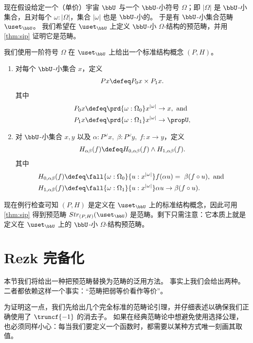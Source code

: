 现在假设给定一个（单价）宇宙 $\bbU$ 与一个 $\bbU$-小符号 $\Omega$；即 $|\Omega|$ 是 $\bbU$-小集合，且对每个 $\omega:|\Omega|$，集合 $|\omega|$ 也是 $\bbU$-小的。
于是有 $\bbU$-小集合范畴 $\uset_\bbU$。
我们希望在 $\uset_\bbU$ 上定义 $\bbU$-小 $\Omega$-结构的预范畴，并用 \cref{thm:sip} 证明它是范畴。

我们使用一阶符号 $\Omega$ 在 $\uset_\bbU$ 上给出一个标准结构概念 $(P,H)$。

\begin{defn}\label{defn:fo-notion-of-structure}
\mbox{}
\begin{enumerate}
\item 对每个 $\bbU$-小集合 $x$，定义
  \[ Px \defeq P_0x\times P_1x.\]
  其中
  \begin{align*}
    P_0x &\defeq \prd{\omega:\Omega_0} x^{|\omega|}\to x, \mbox{ and } \\
    P_1x &\defeq \prd{\omega:\Omega_1} x^{|\omega|}\to \propU,
  \end{align*}
\item 对 $\bbU$-小集合 $x,y$ 以及
  $\alpha:P^\omega x,\;\beta:P^\omega y,\; f:x\to y$，定义
  \[ H_{\alpha\beta}(f) \defeq H_{0,\alpha\beta}(f)\wedge H_{1,\alpha\beta}(f).\]
  其中
  \begin{align*}
    H_{0,\alpha\beta}(f) &\defeq
    \fall{\omega:\Omega_0}{u:x^{|\omega|}} f(\alpha u)=\;\beta(f\circ u),
    \mbox{ and }\\
    H_{1,\alpha\beta}(f) &\defeq
    \fall{\omega:\Omega_1}{u:x^{|\omega|}} \alpha u\to\beta(f\circ u).
  \end{align*}
\end{enumerate}
\end{defn}

现在例行检查可知 $(P,H)$ 是定义在 $\uset_\bbU$ 上的标准结构概念，因此可用 \cref{thm:sip} 得到预范畴 $Str_{(P,H)}(\uset_\bbU)$ 是范畴。剩下只需注意：它本质上就是定义在 $\uset_\bbU$ 上的 $\bbU$-小 $\Omega$-结构预范畴。

\section{Rezk 完备化}
\label{sec:rezk}

本节我们将给出一种把预范畴替换为范畴的泛用方法。
事实上我们会给出两种。
二者都依赖这样一个事实：\textquotedblleft 范畴把弱等价看作等价\textquotedblright 。

为证明这一点，我们先给出几个完全标准的范畴论引理，并仔细表述以确保我们正确使用了 $\truncf{-1}$ 的消去子。
如果在经典范畴论中想避免使用选择公理，也必须同样小心：每当我们要定义一个函数时，都需要以某种方式唯一刻画其取值。

